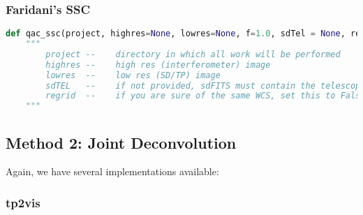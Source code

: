 \documentclass[12pt,a4paper]{article}
\begin{document}
\subsubsection{Faridani's SSC}

\begin{lstlisting}[language=Python]
def qac_ssc(project, highres=None, lowres=None, f=1.0, sdTel = None, regrid=True, cleanup=True, label="", niteridx=0, name="dirtymap"):
    """
        project --    directory in which all work will be performed
        highres --    high res (interferometer) image
        lowres  --    low res (SD/TP) image
        sdTEL   --    if not provided, sdFITS must contain the telescope
        regrid  --    if you are sure of the same WCS, set this to False
    """
\end{lstlisting}

\subsection{Method 2: Joint Deconvolution}

Again, we have several implementations available:

\subsubsection{tp2vis}
\end{document}
